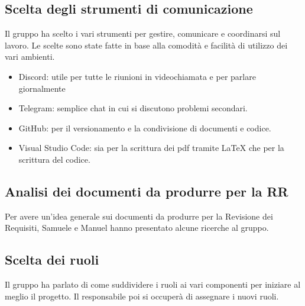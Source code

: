 \documentclass{article}
\begin{document}
        \subsection{Scelta degli strumenti di comunicazione}
        Il gruppo ha scelto i vari strumenti per gestire, comunicare e coordinarsi sul lavoro.
        Le scelte sono state fatte in base alla comodità e facilità di utilizzo dei
        vari ambienti.
        \begin{itemize}
            \item Discord: utile per tutte le riunioni in videochiamata e per parlare giornalmente
            \item Telegram: semplice chat in cui si discutono problemi secondari.
            \item GitHub: per il versionamento e la condivisione di documenti e codice.
            \item Visual Studio Code: sia per la scrittura dei pdf tramite LaTeX che per la scrittura del codice.
        \end{itemize}

        \subsection{Analisi dei documenti da produrre per la RR}
        Per avere un'idea generale sui documenti da produrre per la Revisione dei Requisiti,
        Samuele e Manuel hanno presentato alcune ricerche al gruppo.

        \subsection{Scelta dei ruoli}
        Il gruppo ha parlato di come suddividere i ruoli ai vari componenti per iniziare al meglio il progetto. Il responsabile poi si occuperà di assegnare i nuovi ruoli.
\end{document}
